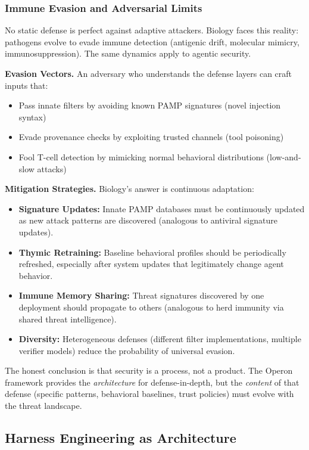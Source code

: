 \subsubsection{Immune Evasion and Adversarial Limits}

No static defense is perfect against adaptive attackers. Biology faces this reality: pathogens evolve
to evade immune detection (antigenic drift, molecular mimicry, immunosuppression). The same dynamics
apply to agentic security.

\textbf{Evasion Vectors.} An adversary who understands the defense layers can craft inputs that:
\begin{itemize}[leftmargin=*]
\item Pass innate filters by avoiding known PAMP signatures (novel injection syntax)
\item Evade provenance checks by exploiting trusted channels (tool poisoning)
\item Fool T-cell detection by mimicking normal behavioral distributions (low-and-slow attacks)
\end{itemize}

\textbf{Mitigation Strategies.} Biology's answer is continuous adaptation:
\begin{itemize}[leftmargin=*]
\item \textbf{Signature Updates:} Innate PAMP databases must be continuously updated as new attack
patterns are discovered (analogous to antiviral signature updates).
\item \textbf{Thymic Retraining:} Baseline behavioral profiles should be periodically refreshed,
especially after system updates that legitimately change agent behavior.
\item \textbf{Immune Memory Sharing:} Threat signatures discovered by one deployment should propagate
to others (analogous to herd immunity via shared threat intelligence).
\item \textbf{Diversity:} Heterogeneous defenses (different filter implementations, multiple verifier
models) reduce the probability of universal evasion.
\end{itemize}

The honest conclusion is that security is a process, not a product. The Operon framework provides the
\textit{architecture} for defense-in-depth, but the \textit{content} of that defense (specific patterns,
behavioral baselines, trust policies) must evolve with the threat landscape.

\subsection{Harness Engineering as Architecture}


